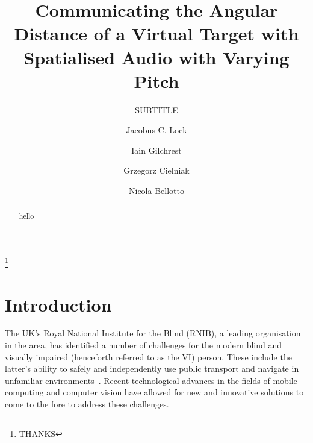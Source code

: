 \documentclass[format=sigconf, review=true, screen=true, anonymous=true]{acmart}
\begin{document}

\title[Communicating the Angular Distance of a Virtual Target]{Communicating the Angular Distance of a Virtual Target with Spatialised Audio with Varying Pitch}
\subtitle{SUBTITLE}

\author{Jacobus C. Lock}

\author{Iain Gilchrest}

\author{Grzegorz Cielniak}

\author{Nicola Bellotto}

\thanks{THANKS}



\maketitle

\begin{abstract}
  hello
\end{abstract}

\section{Introduction}

The UK's Royal National Institute for the Blind (RNIB), a leading organisation in the area, has identified a number of challenges for the modern blind and visually impaired (henceforth referred to as the VI) person. These include the latter's ability to safely and independently use public transport and navigate in unfamiliar environments~\cite{rnib-objectives}. Recent technological advances in the fields of mobile computing and computer vision have allowed for new and innovative solutions to come to the fore to address these challenges. 
\end{document}
